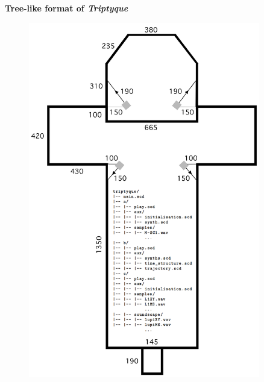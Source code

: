\newpage

\noindent \textbf{{\large Tree-like format of \textit{Triptyque}}}
\hrulefill

 \begin{figure}[H]
\begin{center}
\includegraphics[width=0.9\textwidth]{img/4361.png}
\end{center}
\end{figure}

